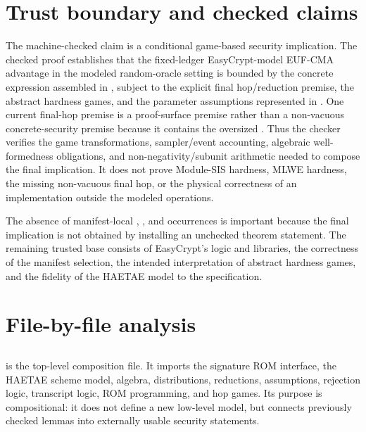 \section{Trust boundary and checked claims}
\label{app:ec-trust-boundary}

The machine-checked claim is a conditional game-based security implication.  The
checked proof establishes that the fixed-ledger EasyCrypt-model EUF-CMA
advantage in the modeled random-oracle setting is bounded by the concrete
expression assembled in , subject to the explicit
final hop/reduction premise, the abstract hardness games, and the parameter
assumptions represented in .  One current
final-hop premise is a
proof-surface premise rather than a non-vacuous concrete-security premise because
it contains the oversized .  Thus the
checker verifies the game transformations, sampler/event accounting, algebraic
well-formedness obligations, and non-negativity/subunit arithmetic needed to
compose the final implication.  It does not prove Module-SIS hardness, MLWE
hardness, the missing non-vacuous final hop, or the physical correctness of an
implementation outside the modeled operations.

The absence of manifest-local , , and
 occurrences is important because the final implication is not
obtained by installing an unchecked theorem statement.  The remaining trusted
base consists of EasyCrypt's logic and libraries, the correctness of the
manifest selection, the intended interpretation of abstract hardness games, and
the fidelity of the HAETAE model to the specification.

\section{File-by-file analysis}
\label{app:ec-file-analysis}

\subsection[HAETAE\_Security.ec]{\texorpdfstring{}{HAETAE\_Security.ec}}

 is the top-level composition file.  It imports the
signature ROM interface, the HAETAE scheme model, algebra, distributions,
reductions, assumptions, rejection logic, transcript logic, ROM programming,
and hop games.  Its purpose is compositional: it does not define a new
low-level model, but connects previously checked lemmas into externally usable
security statements.

